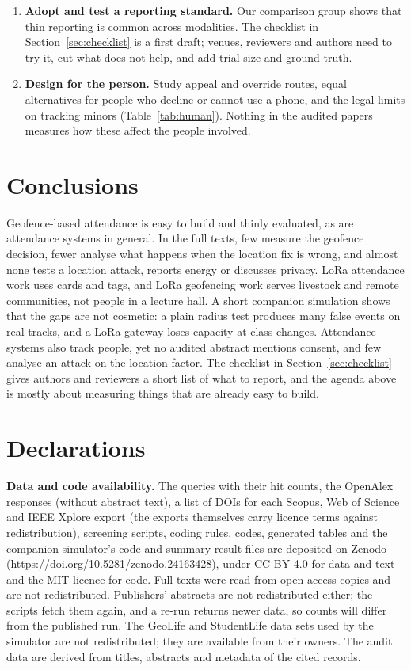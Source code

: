 \documentclass[preprint,12pt]{elsarticle}
\begin{document}
\begin{enumerate}
\item \textbf{Adopt and test a reporting standard.} Our comparison group shows that thin reporting is common across modalities. The checklist in Section~\ref{sec:checklist} is a first draft; venues, reviewers and authors need to try it, cut what does not help, and add trial size and ground truth.
\item \textbf{Design for the person.} Study appeal and override routes, equal alternatives for people who decline or cannot use a phone, and the legal limits on tracking minors (Table~\ref{tab:human}). Nothing in the audited papers measures how these affect the people involved.
\end{enumerate}

\section{Conclusions}
Geofence-based attendance is easy to build and thinly evaluated, as are attendance systems in general. In the \ftN{} full texts, few measure the geofence decision, fewer analyse what happens when the location fix is wrong, and almost none tests a location attack, reports energy or discusses privacy. LoRa attendance work uses cards and tags, and LoRa geofencing work serves livestock and remote communities, not people in a lecture hall. A short companion simulation shows that the gaps are not cosmetic: a plain radius test produces many false events on real tracks, and a LoRa gateway loses capacity at class changes. Attendance systems also track people, yet no audited abstract mentions consent, and few analyse an attack on the location factor. The checklist in Section~\ref{sec:checklist} gives authors and reviewers a short list of what to report, and the agenda above is mostly about measuring things that are already easy to build.

\section*{Declarations}
\noindent\textbf{Data and code availability.} The queries with their hit counts, the OpenAlex responses (without abstract text), a list of DOIs for each Scopus, Web of Science and IEEE Xplore export (the exports themselves carry licence terms against redistribution), screening scripts, coding rules, codes, generated tables and the companion simulator's code and summary result files are deposited on Zenodo (\url{https://doi.org/10.5281/zenodo.24163428}), under CC BY 4.0 for data and text and the MIT licence for code. Full texts were read from open-access copies and are not redistributed. Publishers' abstracts are not redistributed either; the scripts fetch them again, and a re-run returns newer data, so counts will differ from the published run. The GeoLife and StudentLife data sets used by the simulator are not redistributed; they are available from their owners. The audit data are derived from titles, abstracts and metadata of the cited records.
\end{document}

